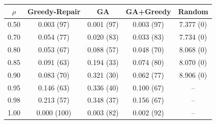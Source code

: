 \begin{tabular}{ccccc}
\toprule
$\rho$ & Greedy-Repair & GA & GA+Greedy & Random \\
\midrule
0.50 & 0.003 (97) & 0.001 (97) & 0.003 (97) & 7.377 (0) \\
0.70 & 0.054 (77) & 0.020 (83) & 0.033 (83) & 7.734 (0) \\
0.80 & 0.053 (67) & 0.088 (57) & 0.048 (70) & 8.068 (0) \\
0.85 & 0.091 (63) & 0.194 (33) & 0.074 (80) & 8.070 (0) \\
0.90 & 0.083 (70) & 0.321 (30) & 0.062 (77) & 8.906 (0) \\
0.95 & 0.146 (63) & 0.336 (40) & 0.100 (67) & -- \\
0.98 & 0.213 (57) & 0.348 (37) & 0.156 (67) & -- \\
1.00 & 0.000 (100) & 0.003 (82) & 0.002 (92) & -- \\
\bottomrule
\end{tabular}
